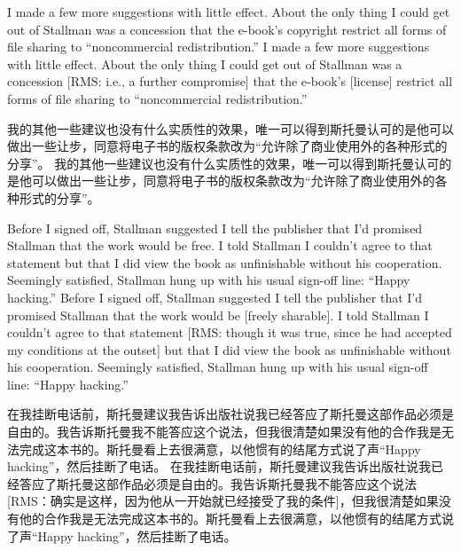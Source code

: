 \ifdefined{}
\fi
\fi

\ifdefined\eng
\ifdefined\vone
I made a few more suggestions with little effect. About the only thing I could get out of Stallman was a concession that the e-book's copyright restrict all forms of file sharing to ``noncommercial redistribution.''
\fi
\ifdefined\vtwo
I made a few more suggestions with little effect. About the only thing I could get out of Stallman was a concession [RMS: i.e., a further compromise] that the e-book's  [license] restrict all forms of file sharing to ``noncommercial redistribution.''
\fi
\fi

\ifdefined\chs
\ifdefined\vone
我的其他一些建议也没有什么实质性的效果，唯一可以得到斯托曼认可的是他可以做出一些让步，同意将电子书的版权条款改为``允许除了商业使用外的各种形式的分享''。
\fi
\ifdefined\vtwo
我的其他一些建议也没有什么实质性的效果，唯一可以得到斯托曼认可的是他可以做出一些让步，同意将电子书的版权条款改为``允许除了商业使用外的各种形式的分享''。
\fi
\fi

\ifdefined\eng
\ifdefined\vone
Before I signed off, Stallman suggested I tell the publisher that I'd promised Stallman that the work would be free. I told Stallman I couldn't agree to that statement but that I did view the book as unfinishable without his cooperation. Seemingly satisfied, Stallman hung up with his usual sign-off line: ``Happy hacking.''
\fi
\ifdefined\vtwo
Before I signed off, Stallman suggested I tell the publisher that I'd promised Stallman that the work would be [freely sharable]. I told Stallman I couldn't agree to that statement [RMS: though it was true, since he had accepted my conditions at the outset] but that I did view the book as unfinishable without his cooperation. Seemingly satisfied, Stallman hung up with his usual sign-off line: ``Happy hacking.''
\fi
\fi

\ifdefined\chs
\ifdefined\vone
在我挂断电话前，斯托曼建议我告诉出版社说我已经答应了斯托曼这部作品必须是自由的。我告诉斯托曼我不能答应这个说法，但我很清楚如果没有他的合作我是无法完成这本书的。斯托曼看上去很满意，以他惯有的结尾方式说了声``Happy hacking''，然后挂断了电话。
\fi
\ifdefined\vtwo
在我挂断电话前，斯托曼建议我告诉出版社说我已经答应了斯托曼这部作品必须是自由的。我告诉斯托曼我不能答应这个说法[RMS：确实是这样，因为他从一开始就已经接受了我的条件]，但我很清楚如果没有他的合作我是无法完成这本书的。斯托曼看上去很满意，以他惯有的结尾方式说了声``Happy hacking''，然后挂断了电话。
\fi
\fi

